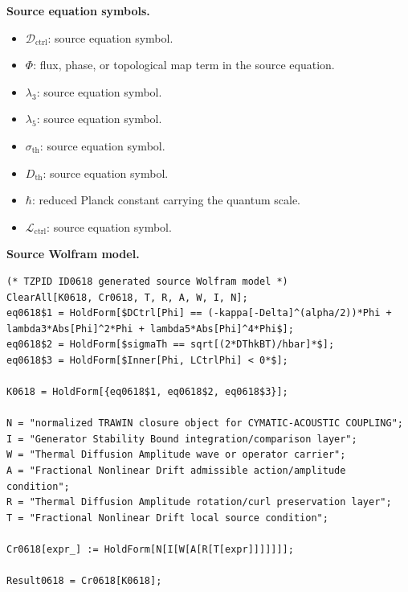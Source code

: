\begin{minipage}[t]{0.49\linewidth}
\begingroup
\small
\raggedright
\textbf{Source equation symbols.}\par
\begin{itemize}[leftmargin=1.35em,itemsep=1pt,topsep=1pt,parsep=0pt]
    \item $\mathcal{D}_{\mathrm{ctrl}}$: source equation symbol.
    \item $\Phi$: flux, phase, or topological map term in the source equation.
    \item $\lambda_3$: source equation symbol.
    \item $\lambda_5$: source equation symbol.
    \item $\sigma_{\mathrm{th}}$: source equation symbol.
    \item $D_{\mathrm{th}}$: source equation symbol.
    \item $\hbar$: reduced Planck constant carrying the quantum scale.
    \item $\mathcal{L}_{\mathrm{ctrl}}$: source equation symbol.
\end{itemize}
\endgroup
\end{minipage}\hfill
\begin{minipage}[t]{0.47\linewidth}
\begingroup
\scriptsize
\raggedright
\textbf{Source Wolfram model.}\par
\begin{Verbatim}[fontsize=\tiny,breaklines=true,breakanywhere=true]
(* TZPID ID0618 generated source Wolfram model *)
ClearAll[K0618, Cr0618, T, R, A, W, I, N];
eq0618$1 = HoldForm[$DCtrl[Phi] == (-kappa[-Delta]^(alpha/2))*Phi + lambda3*Abs[Phi]^2*Phi + lambda5*Abs[Phi]^4*Phi$];
eq0618$2 = HoldForm[$sigmaTh == sqrt[(2*DThkBT)/hbar]*$];
eq0618$3 = HoldForm[$Inner[Phi, LCtrlPhi] < 0*$];

K0618 = HoldForm[{eq0618$1, eq0618$2, eq0618$3}];

N = "normalized TRAWIN closure object for CYMATIC-ACOUSTIC COUPLING";
I = "Generator Stability Bound integration/comparison layer";
W = "Thermal Diffusion Amplitude wave or operator carrier";
A = "Fractional Nonlinear Drift admissible action/amplitude condition";
R = "Thermal Diffusion Amplitude rotation/curl preservation layer";
T = "Fractional Nonlinear Drift local source condition";

Cr0618[expr_] := HoldForm[N[I[W[A[R[T[expr]]]]]]];

Result0618 = Cr0618[K0618];
\end{Verbatim}
\endgroup
\end{minipage}


